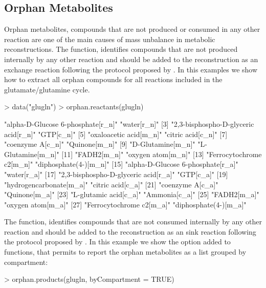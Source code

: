 \subsection{Orphan Metabolites}
Orphan metabolites, compounds that are not produced or consumed in any other reaction are one of the main causes of mass unbalance in metabolic reconstructions. The  function, identifies compounds that are not produced internally by any other reaction and should be added to the reconstruction as an exchange reaction following the protocol proposed by \cite{Thiele2010}.  In this examples we show how to extract all orphan compounds for all reactions included in the glutamate/glutamine cycle.
\begin{Schunk}
\begin{Sinput}
> data("glugln")
> orphan.reactants(glugln)
\end{Sinput}
\begin{Soutput}
 [1] "alpha-D-Glucose 6-phosphate[r_n]"    "water[r_n]"                         
 [3] "2,3-bisphospho-D-glyceric acid[r_n]" "GTP[c_n]"                           
 [5] "oxaloacetic acid[m_n]"               "citric acid[c_n]"                   
 [7] "coenzyme A[c_n]"                     "Quinone[m_n]"                       
 [9] "D-Glutamine[m_n]"                    "L-Glutamine[m_n]"                   
[11] "FADH2[m_n]"                          "oxygen atom[m_n]"                   
[13] "Ferrocytochrome c2[m_n]"             "diphosphate(4-)[m_n]"               
[15] "alpha-D-Glucose 6-phosphate[r_a]"    "water[r_a]"                         
[17] "2,3-bisphospho-D-glyceric acid[r_a]" "GTP[c_a]"                           
[19] "hydrogencarbonate[m_a]"              "citric acid[c_a]"                   
[21] "coenzyme A[c_a]"                     "Quinone[m_a]"                       
[23] "L-glutamic acid[c_a]"                "Ammonia[c_a]"                       
[25] "FADH2[m_a]"                          "oxygen atom[m_a]"                   
[27] "Ferrocytochrome c2[m_a]"             "diphosphate(4-)[m_a]"               
\end{Soutput}
The  function, identifies compounds that are not consumed internally by any other reaction and should be added to the reconstruction as an sink reaction following the protocol proposed by \cite{Thiele2010}. In this example we show the option added to  functions, that permits to report the orphan metabolites as a list grouped by compartment:
\begin{Sinput}
> orphan.products(glugln, byCompartment = TRUE)
\end{Sinput}
\end{Schunk}

